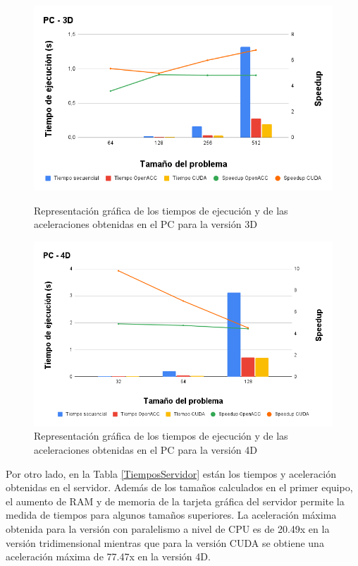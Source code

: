 \begin{figure}[H]
    \centering
    \includegraphics[width=\textwidth]{img/PC - 3D.png}
    \label{GraficoPC3D}
    \caption{Representación gráfica de los tiempos de ejecución y de las aceleraciones obtenidas en el PC para la versión 3D }
\end{figure}


\begin{figure}[H]
    \centering
    \includegraphics[width=\textwidth]{img/PC - 4D.png}
    \caption{Representación gráfica de los tiempos de ejecución y de las aceleraciones obtenidas en el PC para la versión 4D }
    \label{GraficoPC4D}
\end{figure}

Por otro lado, en la Tabla \ref{TiemposServidor} están los tiempos y aceleración obtenidas en el servidor. Además de los tamaños calculados en el primer equipo, el aumento de RAM y de memoria de la tarjeta gráfica del servidor permite la medida de tiempos para algunos tamaños superiores. La aceleración máxima obtenida para la versión con paralelismo a nivel de CPU es de 20.49x en la versión tridimensional mientras que para la versión CUDA se obtiene una aceleración máxima de 77.47x en la versión 4D.

